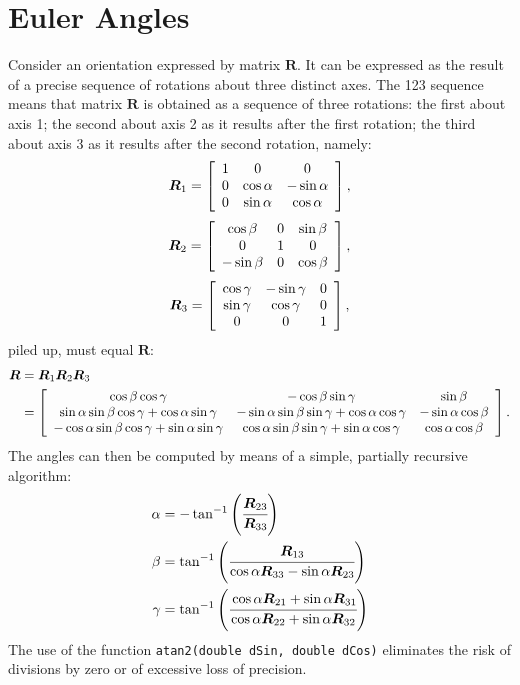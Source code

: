 \documentclass[10pt,dvips,fleqn,subeqn]{report}
\newcommand{\T}[1]{\boldsymbol{#1}}
\begin{document}
\section{Euler Angles}
Consider an orientation expressed by matrix $\T{R}$.
It can be expressed as the result of a precise sequence of rotations 
about three distinct axes.
The 123 sequence means that matrix $\T{R}$ is obtained as a sequence
of three rotations: the first about axis 1; the second about axis 2
as it results after the first rotation; the third about axis 3
as it results after the second rotation, namely:
\begin{equation}
	\T{R}_1 = \sqbr{\matr{ccc}{
		1 & 0 & 0 \\
		0 & \cos\alpha & -\sin\alpha \\
		0 & \sin\alpha & \cos\alpha
	}} ,
\end{equation}
\begin{equation}
	\T{R}_2 = \sqbr{\matr{ccc}{
		\cos\beta & 0 & \sin\beta \\
		0 & 1 & 0 \\
		-\sin\beta & 0 & \cos\beta
	}} ,
\end{equation}
\begin{equation}
	\T{R}_3 = \sqbr{\matr{ccc}{
		\cos\gamma & -\sin\gamma & 0 \\
		\sin\gamma & \cos\gamma & 0 \\
		0 & 0 & 1
	}} ,
\end{equation}
piled up, must equal $\T{R}$:
\begin{align}
	\T{R} &= \T{R}_1 \T{R}_2 \T{R}_3 \\
	&= \sqbr{\matr{ccc}{
		\cos\beta \cos\gamma
		& -\cos\beta \sin\gamma
		& \sin\beta \\
		\sin\alpha \sin\beta \cos\gamma + \cos\alpha \sin\gamma
		& -\sin\alpha \sin\beta \sin\gamma + \cos\alpha \cos\gamma
		& -\sin\alpha \cos\beta \\
		-\cos\alpha \sin\beta \cos\gamma + \sin\alpha \sin\gamma
		& \cos\alpha \sin\beta \sin\gamma + \sin\alpha \cos\gamma
		& \cos\alpha \cos\beta
	}} \nonumber .
\end{align}
The angles can then be computed by means of a simple, 
partially recursive algorithm:
\begin{align}
	\alpha &= - \tan^{-1}\plbr{\cfrac{\T{R}_{23}}{\T{R}_{33}}} \\
	\beta &= \tan^{-1}\plbr{\cfrac{\T{R}_{13}}{
			\cos\alpha \T{R}_{33} - \sin\alpha \T{R}_{23}
		}} \\
	\gamma &= \tan^{-1}\plbr{\cfrac{
		\cos\alpha \T{R}_{21} + \sin\alpha \T{R}_{31}
	}{
		\cos\alpha \T{R}_{22} + \sin\alpha \T{R}_{32}
	}}
\end{align}
The use of the function \texttt{atan2(double dSin, double dCos)}
eliminates the risk of divisions by zero or of excessive loss of precision.
\end{document}
